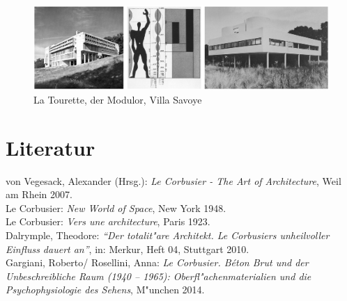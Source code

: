 \documentclass[a4paper]{tufte-handout}
\begin{document}
\begin{figure}[h]
  \includegraphics[width=\linewidth]{slideshow}%
  \caption{La Tourette, der Modulor, Villa Savoye}%
  \label{fig:fullfig}%
\end{figure}



%
%



\section{Literatur}\label{sec:lit}

\begin{fullwidth}

\noindent von Vegesack, Alexander (Hrsg.): \emph{Le Corbusier - The Art of Architecture}, Weil am Rhein 2007.\\

\noindent Le Corbusier: \emph{New World of Space}, New York 1948.\\

\noindent Le Corbusier: \emph{Vers une architecture}, Paris 1923.\\

\noindent Dalrymple, Theodore: \emph{"`Der totalit"are Architekt. Le Corbusiers unheilvoller Einfluss dauert an"'}, in: Merkur, Heft 04, Stuttgart 2010.\\

\noindent Gargiani, Roberto/ Rosellini, Anna: \emph{Le Corbusier. B\'eton Brut und der Unbeschreibliche Raum (1940 -- 1965): Oberfl"achenmaterialien und die Psychophysiologie des Sehens}, M"unchen 2014.\\

\end{fullwidth}
%
%
\end{document}

